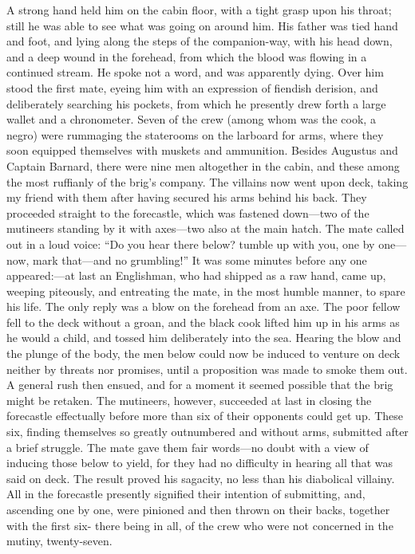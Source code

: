A strong hand held him on the cabin floor, with a tight grasp upon his
throat; still he was able to see what was going on around him. His father was
tied hand and foot, and lying along the steps of the companion-way, with his
head down, and a deep wound in the forehead, from which the blood was flowing in
a continued stream. He spoke not a word, and was apparently dying. Over him
stood the first mate, eyeing him with an expression of fiendish derision, and
deliberately searching his pockets, from which he presently drew forth a large
wallet and a chronometer. Seven of the crew (among whom was the cook, a negro)
were rummaging the staterooms on the larboard for arms, where they soon equipped
themselves with muskets and ammunition. Besides Augustus and Captain Barnard,
there were nine men altogether in the cabin, and these among the most ruffianly
of the brig's company. The villains now went upon deck, taking my friend with
them after having secured his arms behind his back. They proceeded straight to
the forecastle, which was fastened down---two of the mutineers standing by it
with axes---two also at the main hatch. The mate called out in a loud voice: ``Do
you hear there below? tumble up with you, one by one---now, mark that---and no
grumbling!'' It was some minutes before any one appeared:---at last an
Englishman, who had shipped as a raw hand, came up, weeping piteously, and
entreating the mate, in the most humble manner, to spare his life. The only
reply was a blow on the forehead from an axe. The poor fellow fell to the deck
without a groan, and the black cook lifted him up in his arms as he would a
child, and tossed him deliberately into the sea. Hearing the blow and the plunge
of the body, the men below could now be induced to venture on deck neither by
threats nor promises, until a proposition was made to smoke them out. A general
rush then ensued, and for a moment it seemed possible that the brig might be
retaken. The mutineers, however, succeeded at last in closing the forecastle
effectually before more than six of their opponents could get up. These six,
finding themselves so greatly outnumbered and without arms, submitted after a
brief struggle. The mate gave them fair words---no doubt with a view of inducing
those below to yield, for they had no difficulty in hearing all that was said on
deck. The result proved his sagacity, no less than his diabolical villainy. All
in the forecastle presently signified their intention of submitting, and,
ascending one by one, were pinioned and then thrown on their backs, together
with the first six- there being in all, of the crew who were not concerned in
the mutiny, twenty-seven. 

